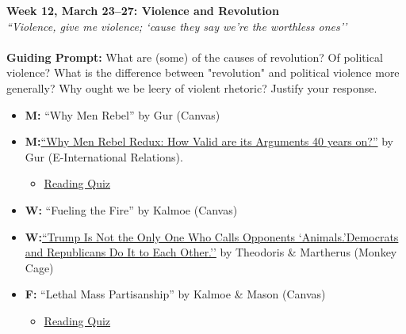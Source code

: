 \documentclass[11pt]{article}
\def\doubleq#1{``#1''}
\begin{document}
\textbf{Week 12, March 23--27: Violence and Revolution}
\\
\textit{\doubleq{Violence, give me violence; `cause they say we're the worthless ones}}
\\\\
\textbf{Guiding Prompt:} What are (some) of the causes of revolution? Of political violence? What is the difference between "revolution" and political violence more generally? Why ought we be leery of violent rhetoric? Justify your response. 
\begin{itemize}
\item \textbf{M:} \doubleq{Why Men Rebel} by Gur (Canvas)
\item \textbf{M:}\href{https://www.e-ir.info/2011/11/17/why-men-rebel-redux-how-valid-are-its-arguments-40-years-on/}{``Why Men Rebel Redux: How Valid are its Arguments 40 years on?''} by Gur (E-International Relations).
\begin{itemize}
\item\underline{Reading Quiz}
\end{itemize}
\item \textbf{W:} \doubleq{Fueling the Fire} by Kalmoe (Canvas)
\item \textbf{W:}\href{https://www.washingtonpost.com/news/monkey-cage/wp/2018/05/21/trump-isnt-the-only-one-who-calls-opponents-animals-democrats-and-republicans-do-it-to-each-other/}{``Trump Is Not the Only One Who Calls Opponents `Animals.'Democrats and Republicans Do It to Each Other.''} by Theodoris \& Martherus (Monkey Cage)
\item \textbf{F:} ``Lethal Mass Partisanship'' by Kalmoe \& Mason (Canvas)
\begin{itemize}
\item\underline{Reading Quiz}
\end{itemize}
\end{itemize}
\end{document}
